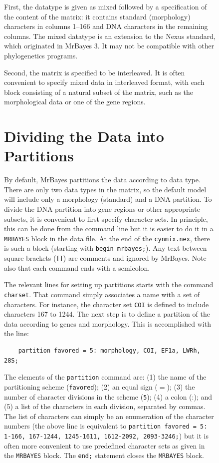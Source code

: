 \documentclass[12pt]{book}
\newcommand{\ttt}[1]{\texttt{#1}}
\begin{document}
\begin{figure}[h]
First, the datatype is given as mixed followed by a specification of the content of the matrix: it
contains standard (morphology) characters in columns 1--166 and DNA characters in the remaining
columns. The mixed datatype is an extension to the Nexus standard, which originated in MrBayes 3.
It may not be compatible with other phylogenetics programs.

Second, the matrix is specified to be interleaved. It is often convenient to specify mixed data in
interleaved format, with each block consisting of a natural subset of the matrix, such as the
morphological data or one of the gene regions.

\section{Dividing the Data into Partitions}

By default, MrBayes partitions the data according to data type. There are only two data types in
the matrix, so the default model will include only a morphology (standard) and a DNA partition. To
divide the DNA partition into gene regions or other appropriate subsets, it is convenient to first
specify character sets. In principle, this can be done from the command line but it is easier to do
it in a \ttt{MRBAYES} block in the data file. At the end of the \ttt{cynmix.nex}, there is such a
block (starting with \ttt{begin mrbayes;}). Any text between square brackets (\ttt{[]}) are
comments and ignored by MrBayes. Note also that each command ends with a semicolon.

The relevant lines for setting up partitions starts with the command \ttt{charset}. That command
simply associates a name with a set of characters. For instance, the character set \ttt{COI} is
defined to include characters 167 to 1244. The next step is to define a partition of the data
according to genes and morphology. This is accomplished with the line:

\begin{singlespacing}
\footnotesize
\begin{verbatim}
    partition favored = 5: morphology, COI, EF1a, LWRh, 28S;
\end{verbatim}
\normalsize
\end{singlespacing}

The elements of the \ttt{partition} command are: (1) the name of the partitioning scheme
(\ttt{favored}); (2) an equal sign ($=$); (3) the number of character divisions in the scheme
(\ttt{5}); (4) a colon (:); and (5) a list of the characters in each division, separated by commas.
The list of characters can simply be an enumeration of the character numbers (the above line is
equivalent to \ttt{partition favored = 5: 1-166, 167-1244, 1245-1611, 1612-2092, 2093-3246;}) but
it is often more convenient to use predefined character sets as given in the \ttt{MRBAYES} block.
The \ttt{end;} statement closes the \ttt{MRBAYES} block.


\end{figure}
\end{document}
